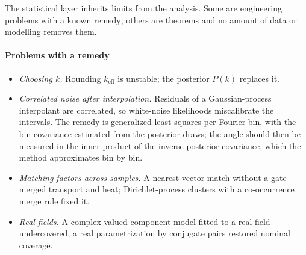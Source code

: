 \documentclass[11pt]{article}
\theoremstyle{plain}
\theoremstyle{definition}
\theoremstyle{remark}
\newcommand{\keff}{k_{\mathrm{eff}}}        %
\begin{document}
The statistical layer inherits limits from the analysis. Some are engineering problems with a known
remedy; others are theorems and no amount of data or modelling removes them.

\paragraph{Problems with a remedy}
\begin{itemize}
  \item \emph{Choosing $k$.} Rounding $\keff$ is unstable; the posterior $P(k)$ replaces it.
  \item \emph{Correlated noise after interpolation.} Residuals of a Gaussian-process interpolant are
  correlated, so white-noise likelihoods miscalibrate the intervals. The remedy is generalized least squares
  per Fourier bin, with the bin covariance estimated from the posterior draws; the angle should then be
  measured in the inner product of the inverse posterior covariance, which the method approximates bin by bin.
  \item \emph{Matching factors across samples.} A nearest-vector match without a gate merged transport and
  heat; Dirichlet-process clusters with a co-occurrence merge rule fixed it.
  \item \emph{Real fields.} A complex-valued component model fitted to a real field undercovered; a real
  parametrization by conjugate pairs restored nominal coverage.
\end{itemize}
\end{document}
